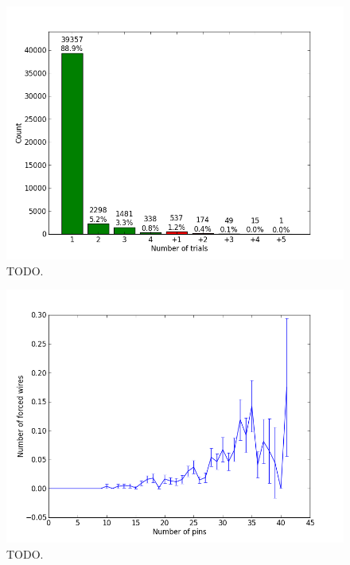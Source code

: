 \begin{figure}[H]
\begin{center}
\includegraphics[width=\textwidth]{Images/final_algorithm_num_trials.png}
\caption{TODO.}
\label{fig:final_num_trials}
\end{center}
\end{figure}

\begin{figure}[H]
\begin{center}
\includegraphics[width=\textwidth]{Images/final_algorithm_num_forced_wires.png}
\caption{TODO.}
\label{fig:final_num_forced_wires}
\end{center}
\end{figure}

